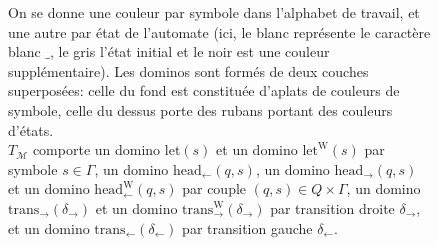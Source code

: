 \documentclass{scrartcl}
\theoremstyle{definition}
\theoremstyle{remark}
\begin{document}
\begin{figure}
  \caption{On se donne une couleur par symbole dans l'alphabet de travail, et une autre par état de l'automate (ici, le blanc représente le caractère blanc $\_$, le gris l'état initial et le noir est une couleur supplémentaire). Les dominos sont formés de deux couches superposées: celle du fond est constituée d'aplats de couleurs de symbole, celle du dessus porte des rubans portant des couleurs d'états.\\$T_\mathcal M$ comporte un domino $\mathrm{let}(s)$ et un domino $\mathrm{let}^\mathrm W(s)$ par symbole $s\in\Gamma$, un domino $\mathrm{head}_\leftarrow(q,s)$, un domino $\mathrm{head}_\rightarrow(q,s)$ et un domino $\mathrm{head}_\leftarrow^\mathrm W(q,s)$ par couple $(q,s)\in Q\times\Gamma$, un domino $\mathrm{trans}_\rightarrow(\delta_\rightarrow)$ et un domino $\mathrm{trans}_\rightarrow^\mathrm W(\delta_\rightarrow)$ par transition droite $\delta_\rightarrow$, et un domino $\mathrm{trans}_\leftarrow(\delta_\leftarrow)$ par transition gauche $\delta_\leftarrow$.}
  \label{fig:tiles}
\end{figure}
\end{document}
